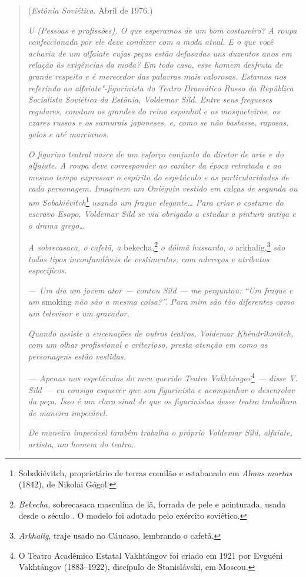 \begin{quotation}
\begin{flushright}
(\emph{Estônia Soviética}. Abril de 1976.)
\end{flushright}
\vspace{4pt}
\noindent\emph{U (Pessoas e profissões). O que esperamos
de um bom costureiro? A roupa confeccionada por ele deve condizer com a
moda atual. E o que você acharia de um alfaiate cujas peças estão
defasadas uns duzentos anos em relação às exigências da moda? Em todo
caso, esse homem desfruta de grande respeito e é merecedor das palavras
mais calorosas. Estamos nos referindo ao alfaiate"-figurinista do Teatro
Dramático Russo da República Socialista Soviética da Estônia, Voldemar
Sild. Entre seus fregueses regulares, constam os grandes do reino
espanhol e os mosqueteiros, os czares russos e os samurais japoneses, e,
como se não bastasse, raposas, galos e até marcianos.}

\emph{O figurino teatral nasce de um esforço conjunto do diretor de arte
e do alfaiate. A roupa deve corresponder ao caráter da época retratada e
ao mesmo tempo expressar o espírito do espetáculo e as particularidades
de cada personagem. Imaginem um Oniéguin vestido em calças de segunda ou
um Sobakiévitch}\footnote{Sobakiévitch, proprietário de terras comilão e
  estabanado em \emph{Almas mortas} (1842), de Nikolai Gógol.}
\emph{usando um fraque elegante\ldots{} Para criar o costume do escravo
Esopo, Voldemar Sild se viu obrigado a estudar a pintura antiga e o
drama grego\ldots{}}

\emph{A sobrecasaca, o cafetã, a} bekecha,\footnote{\emph{Bekecha,}
  sobrecasaca masculina de lã, forrada de pele e acinturada, usada desde
  o século . O modelo foi adotado pelo exército soviético.} \emph{o
dólmã hussardo, o} arkhalig,\footnote{\emph{Arkhalig}, traje
  usado no Cáucaso, lembrando o cafetã.} \emph{são todos tipos
inconfundíveis de vestimentas, com adereços e atributos específicos.}

\emph{--- Um dia um jovem ator --- contou Sild --- me perguntou: ``Um
fraque e um} smoking \emph{não são a mesma coisa?''. Para mim são tão
diferentes como um televisor e um gravador.}

\emph{Quando assiste a encenações de outros teatros, Voldemar
Khéndrikovitch, com um olhar profissional e criterioso, presta atenção
em como as personagens estão vestidas.}

\emph{--- Apenas nos espetáculos do meu querido Teatro
Vakhtángov}\footnote{O Teatro Acadêmico Estatal Vakhtángov foi criado em
  1921 por Evguéni Vakhtángov (1883--1922), discípulo de Stanislávski,
  em Moscou.} \emph{--- disse V. Sild --- eu consigo esquecer que sou
figurinista e acompanhar o desenrolar da peça. Isso é um claro sinal de
que os figurinistas desse teatro trabalham de maneira impecável.}

\emph{De maneira impecável também trabalha o próprio Voldemar Sild,
alfaiate, artista, um homem do teatro.}
\end{quotation}

